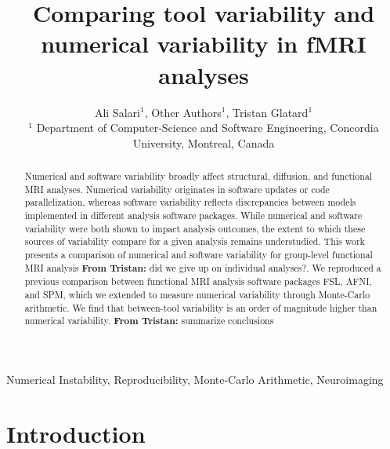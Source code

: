 \documentclass[conference]{IEEEtran}
\begin{document}
\newcommand{\fslspm}{FSL-SPM\xspace}
\newcommand{\fslafni}{FSL-AFNI\xspace}
\newcommand{\afnispm}{AFNI-SPM\xspace}
\newcommand{\tristan}[1]{\color{orange}\textbf{From Tristan:} #1\color{black}\xspace}
\newcommand{\note}[2]{\color{green}\textbf{Note:} #1\color{black}\xspace}



\title{Comparing tool variability and numerical variability in fMRI analyses}

\author{Ali Salari$^1$, Other Authors$^1$, Tristan Glatard$^1$ \\ 
$^1$ Department of Computer-Science and Software Engineering, Concordia University, Montreal, Canada}

\maketitle
\begin{abstract}

Numerical and software variability broadly affect structural, diffusion, and functional MRI analyses. Numerical
variability originates in software updates or code
parallelization, whereas software variability reflects discrepancies between
models implemented in different analysis software packages. While numerical
and software variability were both shown to impact analysis outcomes, the
extent to which these sources of variability compare for a given
analysis remains understudied. This work presents a comparison of
numerical and software variability for group-level functional MRI analysis
\tristan{did we give up on individual analyses?}.
We reproduced a previous comparison between functional MRI analysis 
software packages FSL, AFNI, and SPM, which we extended to measure 
numerical variability through Monte-Carlo arithmetic. 
We find that between-tool variability is an order of magnitude higher than numerical variability.
\tristan{summarize conclusions}

\end{abstract}

\begin{IEEEkeywords}
  Numerical Instability, Reproducibility, Monte-Carlo Arithmetic, Neuroimaging
\end{IEEEkeywords}


\section{Introduction}
\end{document}
